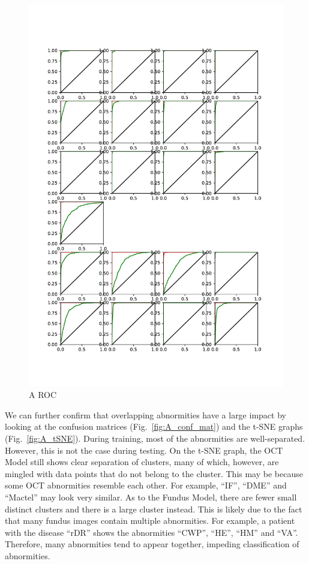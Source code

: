 \documentclass{article}
\begin{document}
	\begin{figure}[htbp]
		\centering
		\includegraphics[width=\linewidth]{Figs/abnormity_ROC.pdf}
		\caption{A ROC}
		\vspace{0.3cm}
		\label{fig:A_ROC}
	\end{figure}
	
	We can further confirm that overlapping abnormities have a large impact by looking at the confusion matrices (Fig.~\ref{fig:A_conf_mat}) and the t-SNE graphs (Fig.~\ref{fig:A_tSNE}). During training, most of the abnormities are well-separated. However, this is not the case during testing. On the t-SNE graph, the OCT Model still shows clear separation of clusters, many of which, however, are mingled with data points that do not belong to the cluster. This may be because some OCT abnormities resemble each other. For example, ``IF'', ``DME'' and ``Mactel'' may look very similar. As to the Fundus Model, there are fewer small distinct clusters and there is a large cluster instead. This is likely due to the fact that many fundus images contain multiple abnormities. For example, a patient with the disease ``rDR'' shows the abnormities ``CWP'', ``HE'', ``HM'' and ``VA''. Therefore, many abnormities tend to appear together, impeding classification of abnormities. 
	
\end{document}
